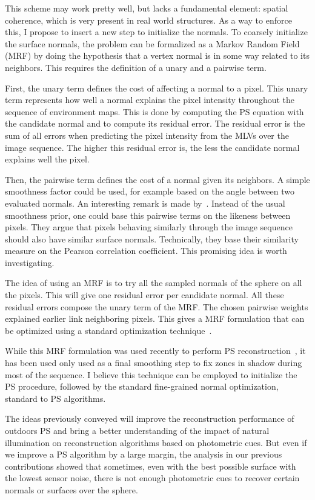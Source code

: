 This scheme may work pretty well, but lacks a fundamental element: spatial coherence, which is very present in real world structures. As a way to enforce this, I propose to insert a new step to initialize the normals. To coarsely initialize the surface normals, the problem can be formalized as a Markov Random Field (MRF) by doing the hypothesis that a vertex normal is in some way related to its neighbors. This requires the definition of a unary and a pairwise term.

First, the unary term defines the cost of affecting a normal to a pixel. This unary term represents how well a normal explains the pixel intensity throughout the sequence of environment maps. This is done by computing the PS equation with the candidate normal and to compute its residual error. The residual error is the sum of all errors when predicting the pixel intensity from the MLVs over the image sequence. The higher this residual error is, the less the candidate normal explains well the pixel.

Then, the pairwise term defines the cost of a normal given its neighbors. A simple smoothness factor could be used, for example based on the angle between two evaluated normals. An interesting remark is made by~\cite{jung-cvpr-15}. Instead of the usual smoothness prior, one could base this pairwise terms on the likeness between pixels. They argue that pixels behaving similarly through the image sequence should also have similar surface normals. Technically, they base their similarity measure on the Pearson correlation coefficient. This promising idea is worth investigating.

The idea of using an MRF is to try all the sampled normals of the sphere on all the pixels. This will give one residual error per candidate normal. All these residual errors compose the unary term of the MRF. The chosen pairwise weights explained earlier link neighboring pixels. This gives a MRF formulation that can be optimized using a standard optimization technique~\cite{Boykov2001a,Kolmogorov2004a,Boykov2004,Bagon2006}.

While this MRF formulation was used recently to perform PS reconstruction~\cite{jung-cvpr-15}, it has been used only used as a final smoothing step to fix zones in shadow during most of the sequence. I believe this technique can be employed to initialize the PS procedure, followed by the standard fine-grained normal optimization, standard to PS algorithms.


The ideas previously conveyed will improve the reconstruction performance of outdoors PS and bring a better understanding of the impact of natural illumination on reconstruction algorithms based on photometric cues. But even if we improve a PS algorithm by a large margin, the analysis in our previous contributions showed that sometimes, even with the best possible surface with the lowest sensor noise, there is not enough photometric cues to recover certain normals or surfaces over the sphere.

